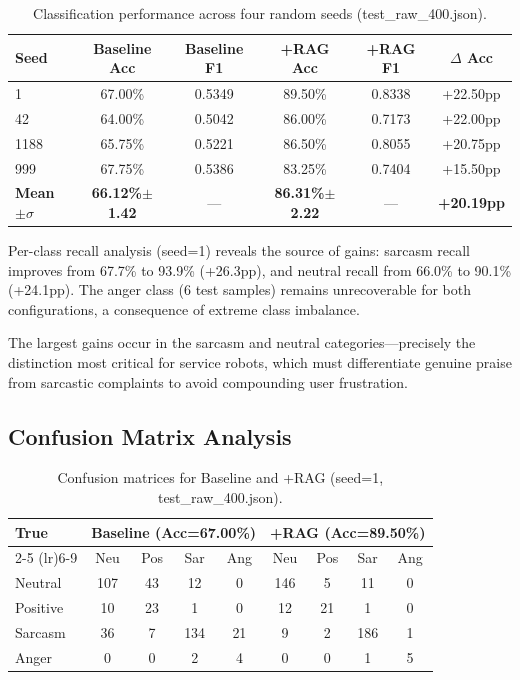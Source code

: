 \documentclass[conference]{IEEEtran}
\begin{document}
\begin{table}[H]
\centering
\caption{Classification performance across four random seeds (test\_raw\_400.json).}
\label{tab:main}
\begin{tabular}{lccccc}
\toprule
\textbf{Seed} & \textbf{Baseline Acc} & \textbf{Baseline F1} & \textbf{+RAG Acc} & \textbf{+RAG F1} & $\Delta$ Acc \\
\midrule
1    & 67.00\% & 0.5349 & 89.50\% & 0.8338 & +22.50pp \\
42   & 64.00\% & 0.5042 & 86.00\% & 0.7173 & +22.00pp \\
1188 & 65.75\% & 0.5221 & 86.50\% & 0.8055 & +20.75pp \\
999  & 67.75\% & 0.5386 & 83.25\% & 0.7404 & +15.50pp \\
\midrule
\textbf{Mean$\pm\sigma$} & \textbf{66.12\%$\pm$1.42} & --- & \textbf{86.31\%$\pm$2.22} & --- & \textbf{+20.19pp} \\
\bottomrule
\end{tabular}
\end{table}

Per-class recall analysis (seed=1) reveals the source of gains: sarcasm recall
improves from 67.7\% to 93.9\% (+26.3pp), and neutral recall from 66.0\% to
90.1\% (+24.1pp). The anger class (6 test samples) remains unrecoverable for
both configurations, a consequence of extreme class imbalance.

The largest gains occur in the sarcasm and neutral categories---precisely the
distinction most critical for service robots, which must differentiate genuine
praise from sarcastic complaints to avoid compounding user frustration.

\subsection{Confusion Matrix Analysis}

\begin{table}[H]
\centering
\caption{Confusion matrices for Baseline and +RAG (seed=1, test\_raw\_400.json).}
\label{tab:cm}
\begin{tabular}{lcccc|cccc}
\toprule
\multirow{2}{*}{\textbf{True}} & \multicolumn{4}{c|}{\textbf{Baseline (Acc=67.00\%)}} & \multicolumn{4}{c}{\textbf{+RAG (Acc=89.50\%)}} \\
\cmidrule(lr){2-5} \cmidrule(lr){6-9}
 & Neu & Pos & Sar & Ang & Neu & Pos & Sar & Ang \\
\midrule
Neutral  & 107 & 43 & 12 & 0  & 146 & 5  & 11 & 0 \\
Positive & 10  & 23 & 1  & 0  & 12  & 21 & 1  & 0 \\
Sarcasm  & 36  & 7  & 134& 21 & 9   & 2  & 186& 1 \\
Anger    & 0   & 0  & 2  & 4  & 0   & 0  & 1  & 5 \\
\bottomrule
\end{tabular}
\end{table}
\end{document}
